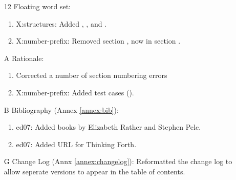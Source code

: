 \begin{itemize}
	\item[12] Floating word set:
		\begin{enumerate}
		\item \textsf{X:structures}: Added
			,
			, and
			.
		\item \textsf{X:number-prefix}:
			Removed section , now
			in section .
		\end{enumerate}

	\item[A] Rationale:
		\begin{enumerate}
		\item Corrected a number of section numbering errors
		\item \textsf{X:number-prefix}:
			Added test cases ().
		\end{enumerate}

	\item[B] Bibliography (Annex \ref{annex:bib}):
		\begin{enumerate}
		\item \textsf{ed07}: Added books by Elizabeth Rather
			and Stephen Pelc.
		\item \textsf{ed07}: Added URL for Thinking Forth.
		\end{enumerate}

	\item[G] Change Log (Annx \ref{annex:changelog}):
		Reformatted the change log to allow seperate versions
		to appear in the table of contents.
	\end{itemize}

